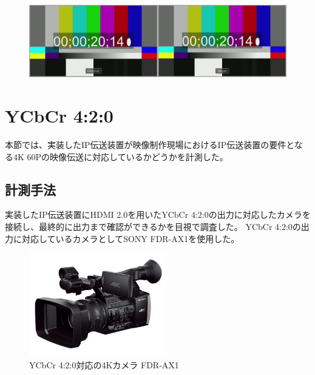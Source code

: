 \begin{figure}[htbp]
  \begin{center}
    \includegraphics[bb=0 0 1920 540,width=14cm]{img/evaluate-delay-hardware.png}
  \end{center}
  \caption[ハードウェア実装による遅延計測のキャプチャー画像]{}
  \label{fig:evaluate-delay-hardware}
\end{figure}

\newpage
\section{YCbCr 4:2:0}
本節では、実装したIP伝送装置が映像制作現場におけるIP伝送装置の要件となる4K 60Pの映像伝送に対応しているかどうかを計測した。

\subsection{計測手法}
実装したIP伝送装置にHDMI 2.0を用いたYCbCr 4:2:0の出力に対応したカメラを接続し、最終的に出力まで確認ができるかを目視で調査した。
YCbCr 4:2:0の出力に対応しているカメラとしてSONY FDR-AX1を使用した。

\begin{figure}[htbp]
  \begin{center}
    \includegraphics[bb=0 0 740 555,width=6cm]{img/FDR-AX1.jpg}
  \end{center}
  \caption{YCbCr 4:2:0対応の4Kカメラ FDR-AX1}
  \label{fig:fdr-ax1}
\end{figure}

